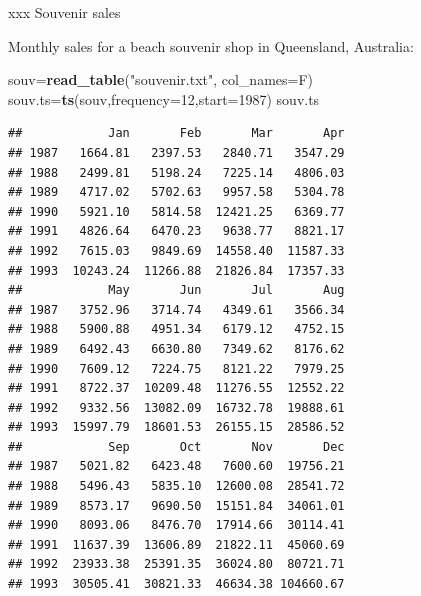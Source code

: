 \documentclass[ignorenonframetext,]{beamer}
\newenvironment{Shaded}{\begin{snugshade}}{\end{snugshade}}
\newcommand{\DataTypeTok}[1]{\textcolor[rgb]{0.13,0.29,0.53}{#1}}
\newcommand{\DecValTok}[1]{\textcolor[rgb]{0.00,0.00,0.81}{#1}}
\newcommand{\KeywordTok}[1]{\textcolor[rgb]{0.13,0.29,0.53}{\textbf{#1}}}
\newcommand{\NormalTok}[1]{#1}
\newcommand{\StringTok}[1]{\textcolor[rgb]{0.31,0.60,0.02}{#1}}
\begin{document}
\begin{frame}[fragile]{xxx Souvenir sales}
\protect\hypertarget{xxx-souvenir-sales}{}

Monthly sales for a beach souvenir shop in Queensland, Australia:

\scriptsize

\begin{Shaded}
\begin{Highlighting}[]
\NormalTok{souv=}\KeywordTok{read_table}\NormalTok{(}\StringTok{"souvenir.txt"}\NormalTok{, }\DataTypeTok{col_names=}\NormalTok{F)}
\NormalTok{souv.ts=}\KeywordTok{ts}\NormalTok{(souv,}\DataTypeTok{frequency=}\DecValTok{12}\NormalTok{,}\DataTypeTok{start=}\DecValTok{1987}\NormalTok{)}
\NormalTok{souv.ts}
\end{Highlighting}
\end{Shaded}

\begin{verbatim}
##            Jan       Feb       Mar       Apr
## 1987   1664.81   2397.53   2840.71   3547.29
## 1988   2499.81   5198.24   7225.14   4806.03
## 1989   4717.02   5702.63   9957.58   5304.78
## 1990   5921.10   5814.58  12421.25   6369.77
## 1991   4826.64   6470.23   9638.77   8821.17
## 1992   7615.03   9849.69  14558.40  11587.33
## 1993  10243.24  11266.88  21826.84  17357.33
##            May       Jun       Jul       Aug
## 1987   3752.96   3714.74   4349.61   3566.34
## 1988   5900.88   4951.34   6179.12   4752.15
## 1989   6492.43   6630.80   7349.62   8176.62
## 1990   7609.12   7224.75   8121.22   7979.25
## 1991   8722.37  10209.48  11276.55  12552.22
## 1992   9332.56  13082.09  16732.78  19888.61
## 1993  15997.79  18601.53  26155.15  28586.52
##            Sep       Oct       Nov       Dec
## 1987   5021.82   6423.48   7600.60  19756.21
## 1988   5496.43   5835.10  12600.08  28541.72
## 1989   8573.17   9690.50  15151.84  34061.01
## 1990   8093.06   8476.70  17914.66  30114.41
## 1991  11637.39  13606.89  21822.11  45060.69
## 1992  23933.38  25391.35  36024.80  80721.71
## 1993  30505.41  30821.33  46634.38 104660.67
\end{verbatim}

\normalsize

\end{frame}
\end{document}
